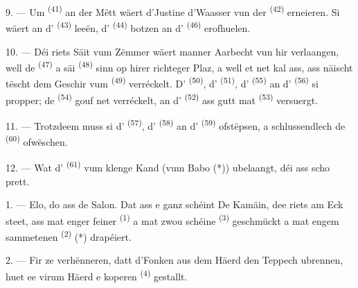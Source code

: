 9. --- Um  \textsuperscript{(41)} an der Mëtt wäert d'Justine
d'Waasser vun der  \textsuperscript{(42)} erneieren. Si wäert
 an d' \textsuperscript{(43)} leeën, d'
\textsuperscript{(44)} botzen an d' \textsuperscript{(46)}
erofhuelen.

10. --- Déi riets Säit vum Zëmmer wäert manner Aarbecht vun hir verlaangen, well de
 \textsuperscript{(47)} a säi 
\textsuperscript{(48)} sinn op hirer richteger Plaz, a well et net kal ass, ass näischt
tëscht dem Geschir vum  \textsuperscript{(49)} verréckelt.
D' \textsuperscript{(50)}, d' \textsuperscript{(51)},
d' \textsuperscript{(55)} an d'
\textsuperscript{(56)} si propper; de  \textsuperscript{(54)}
gouf net verréckelt, an d' \textsuperscript{(52)} ass gutt mat
 \textsuperscript{(53)} versuergt.



11. --- Trotzdeem muss si d' \textsuperscript{(57)}, d'
\textsuperscript{(58)} an d' \textsuperscript{(59)} ofstëpsen, a
schlussendlech de  \textsuperscript{(60)} ofwëschen.

12. --- Wat d' \textsuperscript{(61)} vum klenge Kand (vum Babo (*))
ubelaangt, déi ass scho prett.

\VUsaut{5.0mm}
\VUsaut{3.0mm}

1. --- Elo, do ass de Salon. Dat ass e ganz schéint  De Kamäin, dee
riets am Eck steet, ass mat enger feiner  \textsuperscript{(1)} a mat
zwou schéine  \textsuperscript{(3)} geschmückt a mat engem sammetenen
 \textsuperscript{(2)} (*) drapéiert.

2. --- Fir ze verhënneren, datt d'Fonken aus dem Häerd den Teppech ubrennen, huet
ee virum Häerd e koperen  \textsuperscript{(4)} gestallt.

